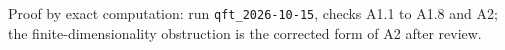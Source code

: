 Proof by exact computation: run \texttt{qft\_2026-10-15}, checks A1.1 to A1.8 and A2; the finite-dimensionality obstruction is the corrected form of A2 after review.
